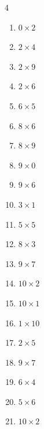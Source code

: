 \begin{multicols}{4}
\begin{enumerate}
  \item $0\times 2$
        \phantom{$=0$}

  \item $2\times 4$
        \phantom{$=8$}

  \item $2\times 9$
        \phantom{$=18$}

  \item $2\times 6$
        \phantom{$=12$}

  \item $6\times 5$
        \phantom{$=30$}

  \item $8\times 6$
        \phantom{$=48$}

  \item $8\times 9$
        \phantom{$=72$}

  \item $9\times 0$
        \phantom{$=0$}

  \item $9\times 6$
        \phantom{$=54$}

  \item $3\times 1$
        \phantom{$=3$}

  \item $5\times 5$
        \phantom{$=25$}

  \item $8\times 3$
        \phantom{$=24$}

  \item $9\times 7$
        \phantom{$=63$}

  \item $10\times 2$
        \phantom{$=20$}

  \item $10\times 1$
        \phantom{$=10$}

\columnbreak %

  \item $1\times 10$
        \phantom{$=10$}

  \item $2\times 5$
        \phantom{$=10$}

  \item $9\times 7$
        \phantom{$=63$}

  \item $6\times 4$
        \phantom{$=24$}

  \item $5\times 6$
        \phantom{$=30$}

  \item $10\times 2$
        \phantom{$=20$}


\end{enumerate}
\end{multicols}
